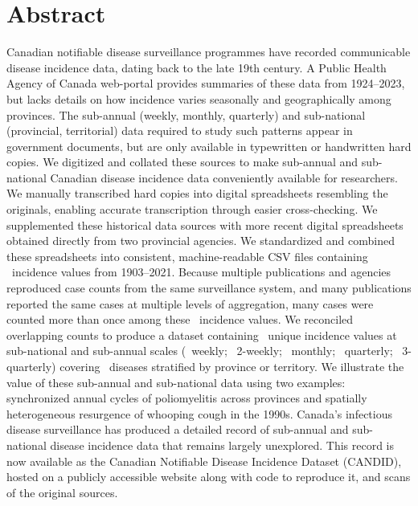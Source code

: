 \documentclass[10pt,letterpaper]{article}
\begin{document}
\section*{Abstract}
Canadian notifiable disease surveillance programmes have recorded communicable disease incidence data, dating back to the late 19th century. A Public Health Agency of Canada web-portal provides summaries of these data from 1924--2023, but lacks details on how incidence varies seasonally and geographically among provinces. The sub-annual (weekly, monthly, quarterly) and sub-national (provincial, territorial) data required to study such patterns appear in government documents, but are only available in typewritten or handwritten hard copies. We digitized and collated these sources to make sub-annual and sub-national Canadian disease incidence data conveniently available for researchers. We manually transcribed hard copies into digital spreadsheets resembling the originals, enabling accurate transcription through easier cross-checking. We supplemented these historical data sources with more recent digital spreadsheets obtained directly from two provincial agencies. We standardized and combined these spreadsheets into consistent, machine-readable CSV files containing \ incidence values from 1903--2021. Because multiple publications and agencies reproduced case counts from the same surveillance system, and many publications reported the same cases at multiple levels of aggregation, many cases were counted more than once among these \ incidence values. We reconciled overlapping counts to produce a dataset containing \ unique incidence values at sub-national and sub-annual scales (\ weekly; \ 2-weekly; \ monthly; \ quarterly; \ 3-quarterly) covering \ diseases stratified by province or territory. We illustrate the value of these sub-annual and sub-national data using two examples: synchronized annual cycles of poliomyelitis across provinces and spatially heterogeneous resurgence of whooping cough in the 1990s. Canada's infectious disease surveillance has produced a detailed record of sub-annual and sub-national disease incidence data that remains largely unexplored. This record is now available as the Canadian Notifiable Disease Incidence Dataset (CANDID), hosted on a publicly accessible website along with code to reproduce it, and scans of the original sources.
\end{document}
